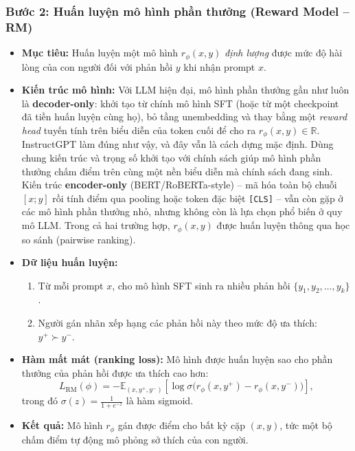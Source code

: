 \subsubsection*{Bước 2: Huấn luyện mô hình phần thưởng (Reward Model -- RM)}

\begin{itemize}
    \item \textbf{Mục tiêu:} Huấn luyện một mô hình \( r_{\phi}(x, y) \) \emph{định lượng} được mức độ hài lòng của con người đối với phản hồi \( y \) khi nhận prompt \( x \).

    \item \textbf{Kiến trúc mô hình:}
    Với LLM hiện đại, mô hình phần thưởng gần như luôn là \textbf{decoder-only}: khởi tạo từ chính mô hình SFT (hoặc từ một checkpoint đã tiền huấn luyện cùng họ), bỏ tầng unembedding và thay bằng một \emph{reward head} tuyến tính trên biểu diễn của token cuối để cho ra \( r_{\phi}(x, y) \in \mathbb{R} \). InstructGPT \cite{ouyang2022training} làm đúng như vậy, và đây vẫn là cách dựng mặc định. Dùng chung kiến trúc và trọng số khởi tạo với chính sách giúp mô hình phần thưởng chấm điểm trên cùng một nền biểu diễn mà chính sách đang sinh.
    Kiến trúc \textbf{encoder-only} (BERT/RoBERTa-style) -- mã hóa toàn bộ chuỗi \([x; y]\) rồi tính điểm qua pooling hoặc token đặc biệt \texttt{[CLS]} -- vẫn còn gặp ở các mô hình phần thưởng nhỏ, nhưng không còn là lựa chọn phổ biến ở quy mô LLM.
    Trong cả hai trường hợp, \( r_{\phi}(x, y) \) được huấn luyện thông qua học so sánh (pairwise ranking).

    \item \textbf{Dữ liệu huấn luyện:}
    \begin{enumerate}
        \item Từ mỗi prompt \( x \), cho mô hình SFT sinh ra nhiều phản hồi \( \{y_1, y_2, \dots, y_k\} \).
        \item Người gán nhãn xếp hạng các phản hồi này theo mức độ ưa thích: \( y^+ \succ y^- \).
    \end{enumerate}

    \item \textbf{Hàm mất mát (ranking loss):}
    Mô hình được huấn luyện sao cho phần thưởng của phản hồi được ưa thích cao hơn:
    \[
        L_{\text{RM}}(\phi)
        = - \mathbb{E}_{(x, y^+, y^-)} \left[
            \log \sigma \big( r_{\phi}(x, y^+) - r_{\phi}(x, y^-) \big)
        \right],
    \]
    trong đó \( \sigma(z) = \frac{1}{1 + e^{-z}} \) là hàm sigmoid.
    \item \textbf{Kết quả:} Mô hình \( r_{\phi} \) gán được điểm cho bất kỳ cặp \((x, y)\), tức một bộ chấm điểm tự động mô phỏng sở thích của con người.
\end{itemize}

